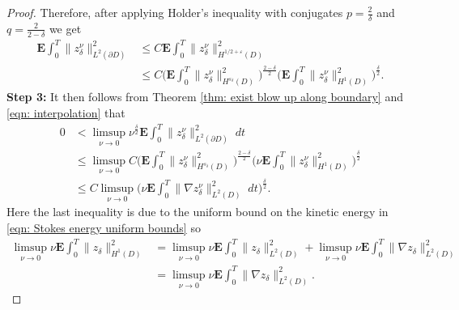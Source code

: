 \documentclass[11pt, reqno]{article}
\def\grad{\nabla}
\def\E{\mathbf{E}}
\begin{document}
\begin{proof}
    Therefore, after applying Holder's inequality with conjugates $p = \frac{2}{\delta}$ and $q = \frac{2}{2-\delta}$ we get
    \begin{align}\label{eqn: interpolation}
        \E\int_0^T\|z_{\delta}^\nu\|_{L^2(\partial D)}^2 &\leq C\E\int_0^T\|z_{\delta}^\nu\|_{H^{1/2 + \varepsilon}(D)}^2\nonumber\\
        &\leq C\Big(\E\int_0^T\|z_{\delta}^\nu\|_{H^{s_\delta}(D)}^2\Big)^{\frac{2-\delta}{2}}\Big(\E\int_0^T\|z_{\delta}^\nu\|_{H^1(D)}^2\Big)^{\frac{\delta}{2}}.
    \end{align}
    \textbf{Step 3:}
    It then follows from Theorem \ref{thm: exist blow up along boundary} and \eqref{eqn: interpolation} that
    \begin{align*}
        0 &< \limsup_{\nu \to 0}\nu^{\frac{\delta}{2}}\E\int_0^T\|z_\delta^\nu\|_{L^2(\partial D)}^2\;dt\\
        &\leq \limsup_{\nu \to 0}C\Big(\E\int_0^T\|z_{\delta}^\nu\|_{H^{s_\delta}(D)}^2\Big)^{\frac{2-\delta}{2}}\Big(\nu\E\int_0^T\|z_{\delta}^\nu\|_{H^1(D)}^2\Big)^{\frac{\delta}{2}}\\
        &\leq C \limsup_{\nu \to 0}\Big(\nu\E\int_0^T\|\grad z_{\delta}^\nu\|_{L^2(D)}^2\;dt\Big)^{\frac{\delta}{2}}.
    \end{align*}
    Here the last inequality is due to the uniform bound on the kinetic energy in \eqref{eqn: Stokes energy uniform bounds} so
    \begin{align*}
        \limsup_{\nu \to 0}\nu\E\int_0^T\|z_{\delta}\|_{H^1(D)}^2 &=  \limsup_{\nu \to 0}\nu\E\int_0^T\|z_{\delta}\|_{L^2(D)}^2 +  \limsup_{\nu \to 0}\nu\E\int_0^T\|\grad z_{\delta}\|_{L^2(D)}^2\\
        &= \limsup_{\nu \to 0}\nu\E\int_0^T\|\grad z_{\delta}\|_{L^2(D)}^2.
    \end{align*}
\end{proof}
\end{document}
